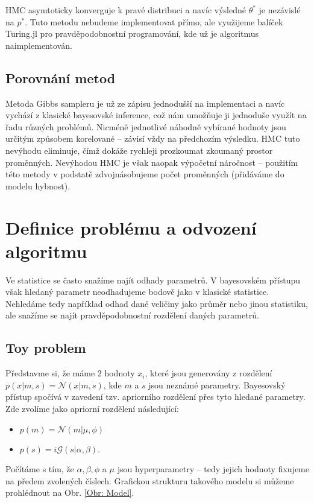 \documentclass[11pt,oneside,american,czech]{article}
\newcommand{\N}{\mathcal{N}}
\newcommand{\G}{\mathcal{G}}
\begin{document}
HMC asymtoticky konverguje k pravé distribuci a navíc výsledné $\theta^{*}$ je nezávislé na $p^{*}$. Tuto metodu nebudeme implementovat přímo, ale využijeme balíček Turing.jl pro pravděpodobnostní programování, kde už je algoritmus naimplementován.

\subsection{Porovnání metod}
Metoda Gibbs sampleru je už ze zápisu jednodušší na implementaci a navíc vychází z klasické bayesovské inference, což nám umožňuje ji jednoduše využít na řadu různých problémů. Nicméně jednotlivé náhodně vybírané hodnoty jsou určitým způsobem korelované -- závisí vždy na předchozím výsledku. HMC tuto nevýhodu eliminuje, čímž dokáže rychleji prozkoumat zkoumaný prostor proměnných. Nevýhodou HMC je však naopak výpočetní náročnost --  použitím této metody v podstatě zdvojnásobujeme počet proměnných (přidáváme do modelu hybnost).

\newpage
\section{Definice problému a odvození algoritmu}

Ve statistice se často snažíme najít odhady parametrů. V bayesovském přístupu však hledaný parametr neodhadujeme bodově jako v klasické statistice. Nehledáme tedy například odhad dané veličiny jako průměr nebo jinou statistiku, ale snažíme se najít pravděpodobnostní rozdělení daných parametrů.

\subsection{Toy problem}
Představme si, že máme 2 hodnoty $x_i$, které jsou generovány z rozdělení $p(x | m, s) = \N(x | m, s)$, kde $m$ a $s$ jsou neznámé parametry. Bayesovský přístup spočívá v zavedení tzv. apriorního rozdělení přes tyto hledané parametry. Zde zvolíme jako apriorní rozdělení následující:
\begin{itemize}
	\item $p(m) = \N(m | \mu, \phi)$
	\item $p(s) = i \G(s | \alpha, \beta)$.
\end{itemize}
Počítáme s tím, že $\alpha, \beta, \phi$ a $\mu$ jsou hyperparametry -- tedy jejich hodnoty fixujeme na předem zvolených číslech. Grafickou strukturu takového modelu si můžeme prohlédnout na Obr. \ref{Obr: Model}.
\end{document}

